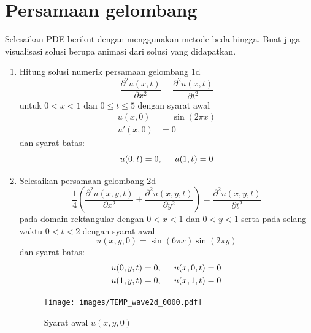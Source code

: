 \documentclass[12pt,bahasa]{article}
\begin{document}
\section{Persamaan gelombang}

Selesaikan PDE berikut dengan menggunakan metode beda hingga.
Buat juga visualisasi solusi berupa animasi dari solusi yang didapatkan.

\begin{enumerate}[label=(\alph*)]
%
\item Hitung solusi numerik persamaan gelombang 1d
\begin{equation}
\frac{\partial^2 u(x,t)}{\partial x^2} = \frac{\partial^2 u(x,t)}{\partial t^2}
\end{equation}
untuk $0 < x < 1$ dan $0 \leq t \leq 5$ dengan syarat awal
\begin{align*}
u(x,0)  & = \sin\left(2\pi x\right) \\
u'(x,0) & = 0
\end{align*}
dan syarat batas:
\begin{equation*}
u(0,t) = 0, \hspace{0.5cm} u(1,t) = 0
\end{equation*}
%
\item Selesaikan persamaan gelombang 2d
\begin{equation}
\frac{1}{4}\left(\frac{\partial^2 u(x,y,t)}{\partial x^2} +
\frac{\partial^2 u(x,y,t)}{\partial y^2}\right)
= \frac{\partial^2 u(x,y,t)}{\partial t^2}
\end{equation}
pada domain rektangular dengan $0 < x < 1$ dan $0 < y < 1$ serta
pada selang waktu $0 < t < 2$ dengan syarat awal
\begin{equation*}
u(x,y,0) = \sin(6\pi x)\sin(2\pi y)
\end{equation*}
dan syarat batas:
\begin{align*}
u(0,y,t) = 0, \hspace{0.5cm} u(x,0,t) = 0 \\
u(1,y,t) = 0, \hspace{0.5cm} u(x,1,t) = 0
\end{align*}

\begin{figure}[H]
\centering
\texttt{[image: images/TEMP\_wave2d\_0000.pdf]}
\par
\caption{Syarat awal $u(x,y,0)$}
\end{figure}
%
\end{enumerate}


%
%
%
%
%
%
%
\end{document}
